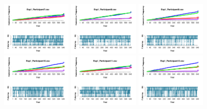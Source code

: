 \begin{figure}[th]
\includegraphics[width=0.30\textwidth]{Figures/Outcome_Exp1_P7} \includegraphics[width=0.30\textwidth]{Figures/Outcome_Exp1_P8} \includegraphics[width=0.30\textwidth]{Figures/Outcome_Exp1_P9}
\includegraphics[width=0.30\textwidth]{Figures/Outcome_Exp1_P10} \includegraphics[width=0.30\textwidth]{Figures/Outcome_Exp1_P11} \includegraphics[width=0.30\textwidth]{Figures/Outcome_Exp1_P12}

\end{figure}
